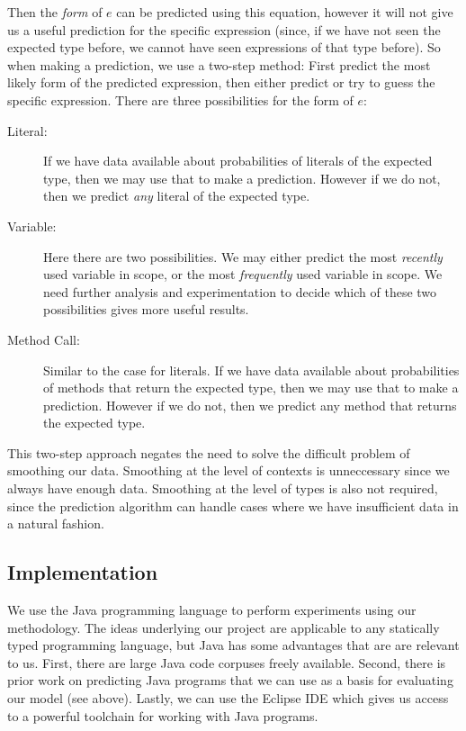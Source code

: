 \documentclass{article} %
\begin{document}
Then the \emph{form} of $e$ can be predicted using this equation, however it will not give us a useful prediction for the specific expression (since, if we have not seen the expected type before, we cannot have seen expressions of that type before). So when making a prediction, we use a two-step method: First predict the most likely form of the predicted expression, then either predict or try to guess the specific expression. There are three possibilities for the form of $e$:
\begin{description}
  \item[Literal:] If we have data available about probabilities of literals of the expected type, then we may use that to make a prediction. However if we do not, then we predict \emph{any} literal of the expected type.
  \item[Variable:] Here there are two possibilities. We may either predict the most \emph{recently} used variable in scope, or the most \emph{frequently} used variable in scope. We need further analysis and experimentation to decide which of these two possibilities gives more useful results.
  \item[Method Call:] Similar to the case for literals. If we have data available about probabilities of methods that return the expected type, then we may use that to make a prediction. However if we do not, then we predict any method that returns the expected type.
\end{description}

This two-step approach negates the need to solve the difficult problem of smoothing our data. Smoothing at the level of contexts is unneccessary since we always have enough data. Smoothing at the level of types is also not required, since the prediction algorithm can handle cases where we have insufficient data in a natural fashion.

\subsection*{Implementation}
We use the Java programming language to perform experiments using our methodology. The ideas underlying our project are applicable to any statically typed programming language, but Java has some advantages that are are relevant to us. First, there are large Java code corpuses freely available. Second, there is prior work on predicting Java programs that we can use as a basis for evaluating our model (see above). Lastly, we can use the Eclipse IDE which gives us access to a powerful toolchain for working with Java programs.
\end{document}
